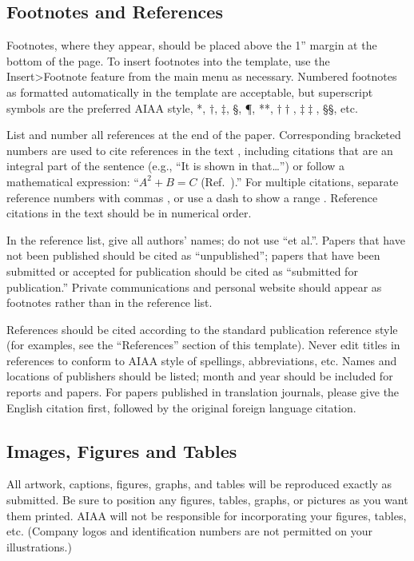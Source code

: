 \documentclass[conf]{new-aiaa}
\begin{document}
\subsection{Footnotes and References}
Footnotes, where they appear, should be placed above the 1'' margin at the bottom of the page. To insert footnotes into the template, use the Insert>Footnote feature from the main menu as necessary. Numbered footnotes as formatted automatically in the template are acceptable, but superscript  symbols are the preferred AIAA style, *, $\dag$, $\ddag$, \S, \P, **, $\dag\dag$, $\ddag\ddag$, \S\S, etc.

List and number all references at the end of the paper. Corresponding bracketed numbers are used to cite references in the text \cite{vatistas1986reverse}, including citations that are an integral part of the sentence (e.g., ``It is shown in \cite{dornheim1996planetary} that\ldots '') or follow a mathematical expression: ``$A^{2} + B = C$ (Ref.~\cite{terster1997nasa}).'' For multiple citations, separate reference numbers with commas \cite{peyret2012computational,oates1997aerothermodynamics}, or use a dash to show a range \cite{volpe1994techniques,thompsonspacecraft,chi1993fluid,brandis2016nonequi}. Reference citations in the text should be in numerical order.

In the reference list, give all authors' names; do not use ``et al.''. Papers that have not been published should be cited as ``unpublished''; papers that have been submitted or accepted for publication should be cited as ``submitted for publication.'' Private communications and personal website should appear as footnotes rather than in the reference list.

References should be cited according to the standard publication reference style (for examples, see the ``References'' section of this template). Never edit titles in references to conform to AIAA style of spellings, abbreviations, etc. Names and locations of publishers should be listed; month and year should be included for reports and papers. For papers published in translation journals, please give the English citation first, followed by the original foreign language citation.

\subsection{Images, Figures and Tables}
All artwork, captions, figures, graphs, and tables will be reproduced exactly as submitted. Be sure to position any figures, tables, graphs, or pictures as you want them printed. AIAA will not be responsible for incorporating your figures, tables, etc. (Company logos and identification numbers are not permitted on your illustrations.)
\end{document}
